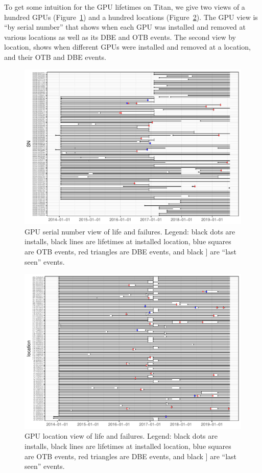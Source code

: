 To get some intuition for the GPU lifetimes on Titan, we give two views of
a hundred GPUs (Figure~\ref{fig:gpuview}) and a hundred locations
(Figure~\ref{fig:locview}). The GPU view is ``by serial number'' that
shows when each GPU was installed and removed at various locations as
well as its DBE and OTB events. The second view by location, shows
when different GPUs were installed and removed at a location, and
their OTB and DBE events.
\begin{figure}[ht]
  \includegraphics[width=6in]{figs/sample_sn.pdf}
  \caption{GPU serial number view of life and failures. Legend: black
    dots are installs, black lines are lifetimes at installed
    location, blue squares are OTB events, red triangles are DBE
    events, and black ] are ``last seen'' events.}
  \label{fig:gpuview}
\end{figure}
\begin{figure}[ht]
  \includegraphics[width=6in]{figs/sample_loc.pdf}
  \caption{GPU location view of life and failures.  Legend: black
    dots are installs, black lines are lifetimes at installed
    location, blue squares are OTB events, red triangles are DBE
    events, and black ] are ``last seen'' events.}
  \label{fig:locview}
\end{figure}
